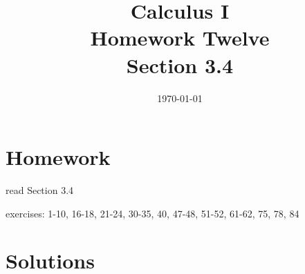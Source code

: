 \documentclass[letterpaper]{exam}
\title{Calculus I \\ Homework Twelve \\ Section 3.4}
\author{}
\date{\today}
\begin{document}
  \maketitle

  \section{Homework}
    \begin{itemize*}
      \item read Section 3.4
      \item exercises: 1-10, 16-18, 21-24, 30-35, 40, 47-48, 51-52, 61-62, 75, 78, 84
    \end{itemize*}

  \ifprintanswers

  \section{Solutions}
\end{document}
